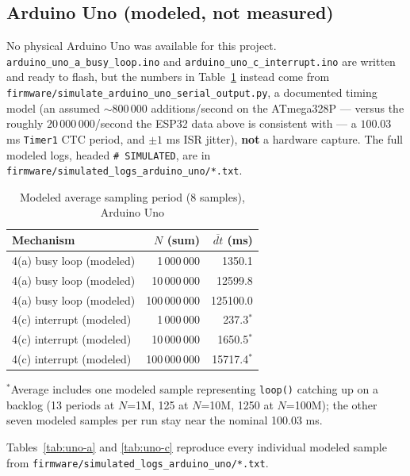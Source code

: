 \subsection{Arduino Uno (modeled, not measured)}
\label{sec:embebidos-uno}

No physical Arduino Uno was available for this project. \texttt{arduino\_uno\_a\_busy\_loop.ino} and \texttt{arduino\_uno\_c\_interrupt.ino} are written and ready to flash, but the numbers in Table~\ref{tab:embebidos-uno} instead come from \texttt{firmware/simulate\_arduino\_uno\_serial\_output.py}, a documented timing model (an assumed $\sim\!800\,000$ additions/second on the ATmega328P — versus the roughly $20\,000\,000$/second the ESP32 data above is consistent with — a $100.03$ ms \texttt{Timer1} CTC period, and $\pm 1$ ms ISR jitter), \textbf{not} a hardware capture. The full modeled logs, headed \texttt{\# SIMULATED}, are in \texttt{firmware/simulated\_logs\_arduino\_uno/*.txt}.

\begin{table}[!t]
\centering
\caption{Modeled average sampling period (8 samples), Arduino Uno}
\label{tab:embebidos-uno}
\small
\begin{tabular}{@{}l r r@{}}
\toprule
Mechanism & $N$ (sum) & $\overline{dt}$ (ms) \\
\midrule
4(a) busy loop (modeled) & 1\,000\,000 & 1350.1 \\
4(a) busy loop (modeled) & 10\,000\,000 & 12599.8 \\
4(a) busy loop (modeled) & 100\,000\,000 & 125100.0 \\
\midrule
4(c) interrupt (modeled) & 1\,000\,000 & 237.3$^{*}$ \\
4(c) interrupt (modeled) & 10\,000\,000 & 1650.5$^{*}$ \\
4(c) interrupt (modeled) & 100\,000\,000 & 15717.4$^{*}$ \\
\bottomrule
\end{tabular}

\vspace{2pt}
{\footnotesize $^{*}$Average includes one modeled sample representing \texttt{loop()} catching up on a backlog (13 periods at $N$=1M, 125 at $N$=10M, 1250 at $N$=100M); the other seven modeled samples per run stay near the nominal 100.03 ms.}
\end{table}

Tables~\ref{tab:uno-a} and \ref{tab:uno-c} reproduce every individual modeled sample from \texttt{firmware/simulated\_logs\_arduino\_uno/*.txt}.

